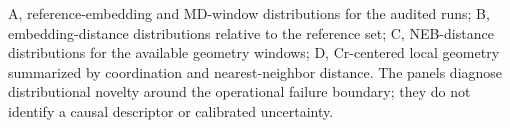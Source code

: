 A, reference-embedding and MD-window distributions for the audited runs; B, embedding-distance distributions relative to the reference set; C, NEB-distance distributions for the available geometry windows; D, Cr-centered local geometry summarized by coordination and nearest-neighbor distance. The panels diagnose distributional novelty around the operational failure boundary; they do not identify a causal descriptor or calibrated uncertainty.
